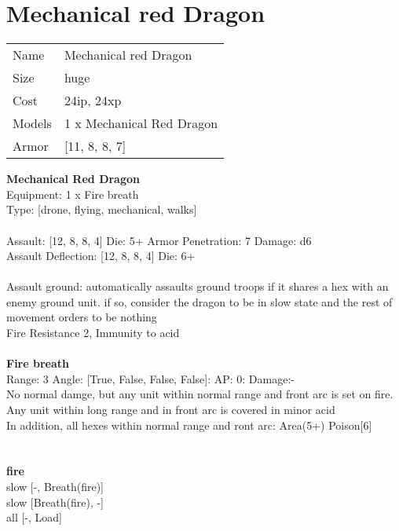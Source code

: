 \pagebreak

\section{ Mechanical red Dragon }

\begin{tabular}{ll}
  Name & Mechanical red Dragon \\
  Size & huge\\
  Cost & 24ip, 24xp\\
  Models & 1 x Mechanical Red Dragon\\
  Armor & [11, 8, 8, 7]\\
\end{tabular}

\noindent 

{\bf Mechanical Red Dragon } \\
Equipment: 1 x Fire breath \\
Type: [drone, flying, mechanical, walks] \\
\ \\
Assault: [12, 8, 8, 4] Die: 5+ Armor Penetration: 7 Damage: d6 \\
Assault Deflection: [12, 8, 8, 4] Die: 6+\\
\indent  
\ \\
Assault ground: automatically assaults ground troops if it shares a hex with an enemy ground unit. if so, consider the dragon to be in slow state and the rest of movement orders to be nothing\\ 
Fire Resistance 2, Immunity to acid\\ 

\ \\
{\bf Fire breath } \\



Range: 3  Angle: [True, False, False, False]: AP: 0: Damage:- \\
No normal damge, but any unit within normal range and front arc is set on fire. Any unit within long range and in front arc is covered in minor acid\\ 
In addition, all hexes within normal range and ront arc: Area(5+) Poison[6]\\ 




 
\ \\




\ \\ {\bf fire } \\
slow [-, Breath(fire)] \\
slow [Breath(fire), -] \\
all [-, Load] \\


